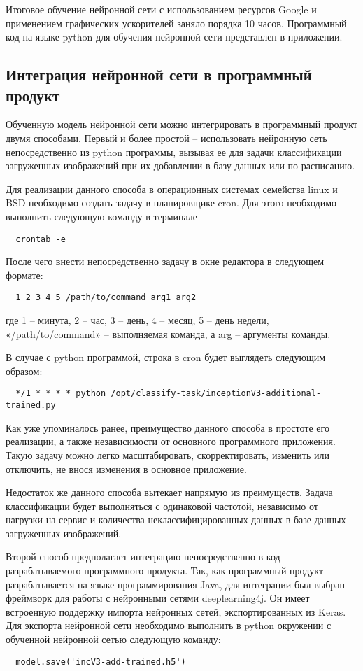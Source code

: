 Итоговое обучение нейронной сети с использованием ресурсов Google и применением графических ускорителей заняло порядка 10 часов. 
Программный код на языке python для обучения нейронной сети представлен в приложении.

\subsection{Интеграция нейронной сети в программный продукт}

Обученную модель нейронной сети можно интегрировать в программный продукт двумя способами. 
Первый и более простой – использовать нейронную сеть непосредственно из python программы, вызывая ее для задачи классификации загруженных изображений при их добавлении в базу данных или по расписанию.


Для реализации данного способа в операционных системах семейства linux и BSD необходимо создать задачу в планировщике cron. 
Для этого необходимо выполнить следующую команду в терминале
\begin{lstlisting}
  crontab -e
\end{lstlisting}
После чего внести непосредственно задачу в окне редактора в следующем формате:
\begin{lstlisting}
  1 2 3 4 5 /path/to/command arg1 arg2
\end{lstlisting}
где 1 – минута, 2 – час, 3 – день, 4 – месяц, 5 – день недели, «/path/to/command» – выполняемая команда, а arg – аргументы команды.


В случае с python программой, строка в cron будет выглядеть следующим образом:
\begin{lstlisting}
  */1 * * * * python /opt/classify-task/inceptionV3-additional-trained.py
\end{lstlisting}

Как уже упоминалось ранее, преимущество данного способа в простоте его реализации, а также независимости от основного программного приложения. 
Такую задачу можно легко масштабировать, скорректировать, изменить или отключить, не внося изменения в основное приложение.


Недостаток же данного способа вытекает напрямую из преимуществ. 
Задача классификации будет выполняться с одинаковой частотой, независимо от нагрузки на сервис и количества неклассифицированных данных в базе данных загруженных изображений.


Второй способ предполагает интеграцию непосредственно в код разрабатываемого программного продукта. 
Так, как программный продукт разрабатывается на языке программирования Java, для интеграции был выбран фреймворк для работы с нейронными сетями deeplearning4j. 
Он имеет встроенную поддержку импорта нейронных сетей, экспортированных из Keras. 
Для экспорта нейронной сети необходимо выполнить в python окружении с обученной нейронной сетью следующую команду:
\begin{lstlisting}
  model.save('incV3-add-trained.h5')
\end{lstlisting}

